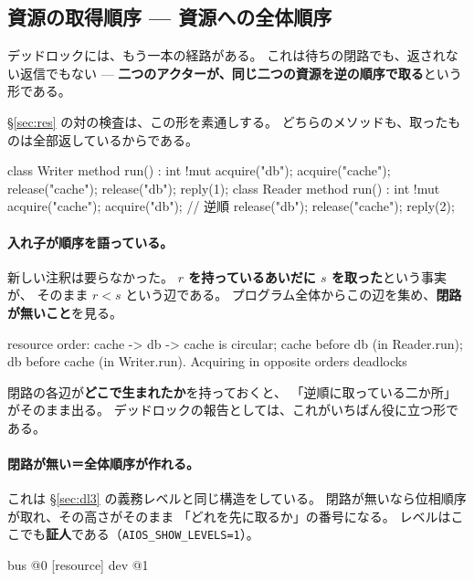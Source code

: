 \documentclass[11pt,a4paper]{ltjsarticle}
\theoremstyle{definition}
\theoremstyle{remark}
\begin{document}
\subsection{資源の取得順序 --- 資源への全体順序}
\label{sec:resorder}

デッドロックには、もう一本の経路がある。
これは待ちの閉路でも、返されない返信でもない ---
\textbf{二つのアクターが、同じ二つの資源を逆の順序で取る}という形である。

\S\ref{sec:res} の対の検査は、この形を素通しする。
どちらのメソッドも、取ったものは全部返しているからである。

\begin{aipl}
class Writer {
  method run() : int !{mut} {
    acquire("db"); acquire("cache");
    release("cache"); release("db"); reply(1);
  }
}
class Reader {
  method run() : int !{mut} {
    acquire("cache"); acquire("db");     // 逆順
    release("db"); release("cache"); reply(2);
  }
}
\end{aipl}

\paragraph{入れ子が順序を語っている。}
新しい注釈は要らなかった。
\textbf{$r$ を持っているあいだに $s$ を取った}という事実が、
そのまま $r < s$ という辺である。
プログラム全体からこの辺を集め、\textbf{閉路が無いこと}を見る。

\begin{term}
 resource order: cache -> db -> cache is circular;
  cache before db (in Reader.run); db before cache (in Writer.run).
  Acquiring in opposite orders deadlocks
\end{term}

閉路の各辺が\textbf{どこで生まれたか}を持っておくと、
「逆順に取っている二か所」がそのまま出る。
デッドロックの報告としては、これがいちばん役に立つ形である。

\paragraph{閉路が無い＝全体順序が作れる。}
これは \S\ref{sec:dl3} の義務レベルと同じ構造をしている。
閉路が無いなら位相順序が取れ、その高さがそのまま
「どれを先に取るか」の番号になる。
レベルはここでも\textbf{証人}である（\texttt{AIOS\_SHOW\_LEVELS=1}）。

\begin{term}
[resource] bus                  @0
[resource] dev                  @1
\end{term}
\end{document}
